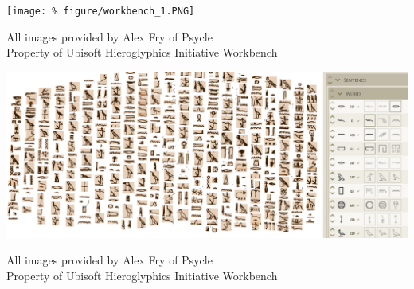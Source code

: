 \documentclass[unknownkeysallowed,usepdftitle=false, parskip=full]{beamer}
\newcommand{\secvariable}{nothing}
\newcommand{\mysection}[1]{\renewcommand{\secvariable}{#1}
}
\begin{document}
\mysection{radar}
\begin{frame}\label{\secvariable}

\texttt{[image: \%
figure/workbench\_1.PNG]}
\vfill
\parbox{\linewidth}{\tiny All images provided by Alex Fry of Psycle
\\Property of Ubisoft Hieroglyphics Initiative Workbench}

\end{frame}

\mysection{line}

\begin{frame}\label{\secvariable}

\begin{center}
  \vspace{-0.5cm}

\includegraphics[width=1\textwidth,keepaspectratio]{figure/PICO_36.png}
\end{center}
\vfill
\parbox{\linewidth}{\tiny All images provided by Alex Fry of Psycle
\\Property of Ubisoft Hieroglyphics Initiative Workbench}

\end{frame}

\mysection{major}
\end{document}
